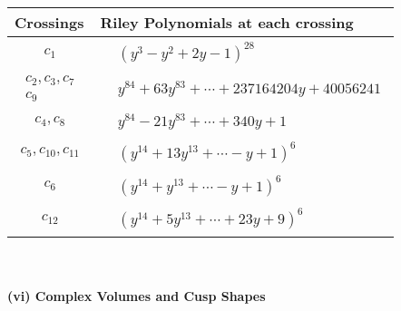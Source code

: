 \documentclass[1p]{elsarticle_modified}
\theoremstyle{definition}
\begin{document}
\begin{tabular}{m{50pt}|m{274pt}}
Crossings & \hspace{64pt}Riley Polynomials at each crossing \\
\hline $$\begin{aligned}c_{1}\end{aligned}$$&$\begin{aligned}
&(y^3- y^2+2 y-1)^{28}
\end{aligned}$\\
\hline $$\begin{aligned}c_{2},c_{3},c_{7}\\c_{9}\end{aligned}$$&$\begin{aligned}
&y^{84}+63 y^{83}+\cdots+237164204 y+40056241
\end{aligned}$\\
\hline $$\begin{aligned}c_{4},c_{8}\end{aligned}$$&$\begin{aligned}
&y^{84}-21 y^{83}+\cdots+340 y+1
\end{aligned}$\\
\hline $$\begin{aligned}c_{5},c_{10},c_{11}\end{aligned}$$&$\begin{aligned}
&(y^{14}+13 y^{13}+\cdots- y+1)^{6}
\end{aligned}$\\
\hline $$\begin{aligned}c_{6}\end{aligned}$$&$\begin{aligned}
&(y^{14}+y^{13}+\cdots- y+1)^{6}
\end{aligned}$\\
\hline $$\begin{aligned}c_{12}\end{aligned}$$&$\begin{aligned}
&(y^{14}+5 y^{13}+\cdots+23 y+9)^{6}
\end{aligned}$\\
\hline
\end{tabular}\\~\\
\newpage\flushleft \textbf{(vi) Complex Volumes and Cusp Shapes}
\end{document}
